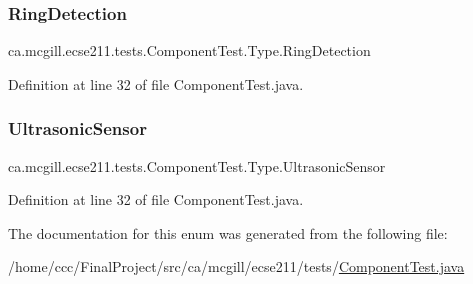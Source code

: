 \subsubsection{\texorpdfstring{Ring\+Detection}{RingDetection}}
{\footnotesize\ttfamily ca.\+mcgill.\+ecse211.\+tests.\+Component\+Test.\+Type.\+Ring\+Detection}



Definition at line 32 of file Component\+Test.\+java.

\mbox{\label{enumca_1_1mcgill_1_1ecse211_1_1tests_1_1_component_test_1_1_type_acb88d74b8bd35b190f8b1b05730c213a}} 
\subsubsection{\texorpdfstring{Ultrasonic\+Sensor}{UltrasonicSensor}}
{\footnotesize\ttfamily ca.\+mcgill.\+ecse211.\+tests.\+Component\+Test.\+Type.\+Ultrasonic\+Sensor}



Definition at line 32 of file Component\+Test.\+java.



The documentation for this enum was generated from the following file\+:\begin{DoxyCompactItemize}
\item 
/home/ccc/\+Final\+Project/src/ca/mcgill/ecse211/tests/\hyperlink{_component_test_8java}{Component\+Test.\+java}\end{DoxyCompactItemize}
